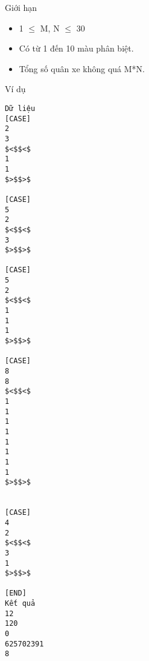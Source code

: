 Giới hạn
\begin{itemize}
	\item     1  $\le$  M, N  $\le$  30   
	\item     Có từ 1 đến 10 màu phân biệt.   
	\item     Tổng số quân xe không quá M*N.   
\end{itemize}
Ví dụ
\begin{verbatim}
Dữ liệu
[CASE]
2
3
$<$$<$
1
1
$>$$>$

[CASE]
5
2
$<$$<$
3
$>$$>$

[CASE]
5
2
$<$$<$
1
1
1
$>$$>$

[CASE]
8
8
$<$$<$
1
1
1
1
1
1
1
1
$>$$>$


[CASE]
4
2
$<$$<$
3
1
$>$$>$

[END]
Kết quả
12
120
0
625702391
8
\end{verbatim}